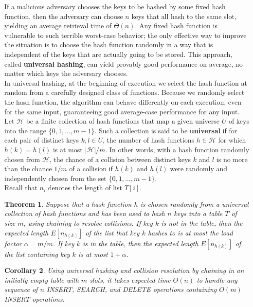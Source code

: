 \documentclass[12pt]{article}
\newtheorem{theorem}{Theorem}
\newtheorem{corollary}[theorem]{Corollary}
\begin{document}
If a malicious adversary chooses the keys to be hashed by some fixed hash function, then the adversary can choose $n$ keys that all hash to the same slot, yielding an average retrieval time of $\Theta(n)$. Any fixed hash function is vulnerable to such terrible worst-case behavior; the only effective way to improve the situation is to choose the hash function randomly in a way that is independent of the keys that are actually going to be stored. This approach, called \textbf {universal hashing}, can yield provably good performance on average, no matter which keys the adversary chooses. \\

In universal hashing, at the beginning of execution we select the hash function at random from a carefully designed class of functions. Because we randomly select the hash function, the algorithm can behave differently on each execution, even for the same input, guaranteeing good average-case performance for any input. \\

Let $\mathcal {H}$ be a finite collection of hash functions that map a given universe $U$ of keys into the range $\{ 0,1,\dots,m-1 \}$. Such a collection is said to be \textbf {universal} if for each pair of distinct keys $k, l \in U$, the number of hash functions $h \in \mathcal {H}$ for which $h(k) = h(l)$ is at most $|\mathcal {H}| / m$. In other words, with a hash function randomly chosen from $\mathcal {H}$, the chance of a collision between distinct keys $k$ and $l$ is no more than the chance $1/m$ of a collision if $h(k)$ and $h(l)$ were randomly and independently chosen from the set $\{ 0,1,\dots, m-1\}$. \\

Recall that $n_i$ denotes the length of list $T[i]$.

\begin{theorem}
  Suppose that a hash function $h$ is chosen randomly from a universal collection of hash functions and has been used to hash $n$ keys into a table $T$ of size $m$, using chaining to resolve collisions. If key $k$ is not in the table, then the expected length $E[n_{h(k)}]$ of the list that key $k$ hashes to is at most the load factor $\alpha = m/m$. If key $k$ is in the table, then the expected length $E[n_{h(k)}]$ of the list containing key $k$ is at most $1 + \alpha$.
\end{theorem}

\begin{corollary}
  Using universal hashing and collision resolution by chaining in an initially empty table with $m$ slots, it takes expected time $\Theta (n)$ to handle any sequence of $n$ INSERT, SEARCH, and DELETE operations containing $O(m)$ INSERT operations.
\end{corollary}
\end{document}
